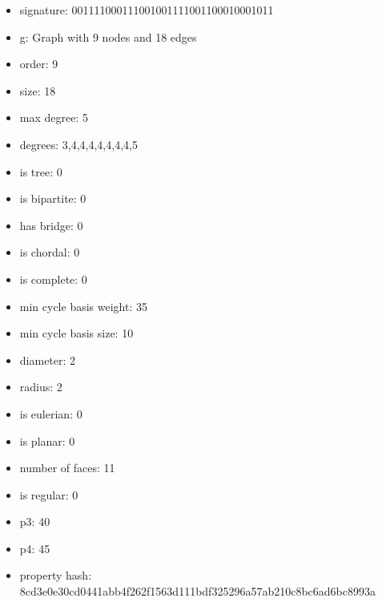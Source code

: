 \newpage
\begin{figure}
\end{figure}
\begin{itemize}
\item signature: 001111000111001001111001100010001011
\item g: Graph with 9 nodes and 18 edges
\item order: 9
\item size: 18
\item max degree: 5
\item degrees: 3,4,4,4,4,4,4,4,5
\item is tree: 0
\item is bipartite: 0
\item has bridge: 0
\item is chordal: 0
\item is complete: 0
\item min cycle basis weight: 35
\item min cycle basis size: 10
\item diameter: 2
\item radius: 2
\item is eulerian: 0
\item is planar: 0
\item number of faces: 11
\item is regular: 0
\item p3: 40
\item p4: 45
\item property hash: 8cd3e0e30cd0441abb4f262f1563d111bdf325296a57ab210c8bc6ad6bc8993a
\end{itemize}

